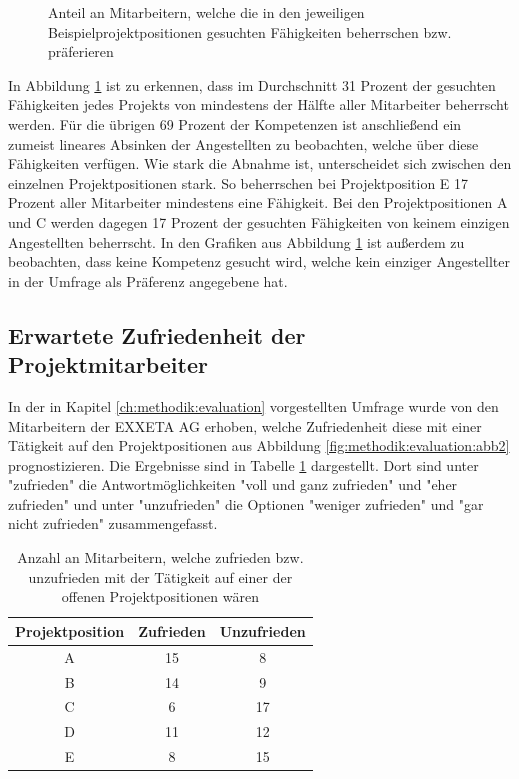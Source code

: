 \begin{figure}[h]
	\caption{Anteil an Mitarbeitern, welche die in den jeweiligen Beispielprojektpositionen gesuchten Fähigkeiten beherrschen bzw. präferieren}
	\label{fig:ergebnisse:analyse:abb6}
\end{figure}

In Abbildung \ref{fig:ergebnisse:analyse:abb6} ist zu erkennen, dass im Durchschnitt 31 Prozent der gesuchten Fähigkeiten jedes Projekts von mindestens der Hälfte aller Mitarbeiter beherrscht werden. Für die übrigen 69 Prozent der Kompetenzen ist anschließend ein zumeist lineares Absinken der Angestellten zu beobachten, welche über diese Fähigkeiten verfügen. Wie stark die Abnahme ist, unterscheidet sich zwischen den einzelnen Projektpositionen stark. So beherrschen bei Projektposition E 17 Prozent aller Mitarbeiter mindestens eine Fähigkeit. Bei den Projektpositionen A und C werden dagegen 17 Prozent der gesuchten Fähigkeiten von keinem einzigen Angestellten beherrscht. In den Grafiken aus Abbildung \ref{fig:ergebnisse:analyse:abb6} ist außerdem zu beobachten, dass keine Kompetenz gesucht wird, welche kein einziger Angestellter in der Umfrage als Präferenz angegebene hat.

\subsection{Erwartete Zufriedenheit der Projektmitarbeiter}
\label{ch:ergebnisse:umfrageMitarbeiter:zufriedenheit}
In der in Kapitel \ref{ch:methodik:evaluation} vorgestellten Umfrage wurde von den Mitarbeitern der EXXETA AG erhoben, welche Zufriedenheit diese mit einer Tätigkeit auf den Projektpositionen aus Abbildung \ref{fig:methodik:evaluation:abb2} prognostizieren. Die Ergebnisse sind in Tabelle \ref{tbl:ergebnisse:umfrageMitarbeiter:zufriedenheit:tbl1} dargestellt. Dort sind unter "zufrieden" die Antwortmöglichkeiten "voll und ganz zufrieden" und "eher zufrieden" und unter "unzufrieden" die Optionen "weniger zufrieden" und "gar nicht zufrieden" zusammengefasst.

\begin{table}[h]
	\centering
	\begin{tabular}{c|c|c}
		\textbf{Projektposition} & \textbf{Zufrieden} & \textbf{Unzufrieden}\\ 
		\hline
		A & 15 & 8\\
		B & 14 & 9\\
		C & 6  & 17\\
		D & 11 & 12\\
		E & 8  & 15
	\end{tabular}
	\caption{Anzahl an Mitarbeitern, welche zufrieden bzw. unzufrieden mit der Tätigkeit auf einer der offenen Projektpositionen wären}
	\label{tbl:ergebnisse:umfrageMitarbeiter:zufriedenheit:tbl1}
\end{table}

